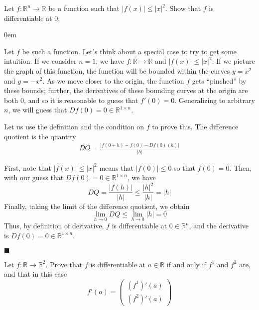 \documentclass[12pt]{article}
\renewcommand{\qed}{\hfill$\blacksquare$}
\renewenvironment{proof}{\begin{addmargin}[1em]{0em}\begin{newproof}}{\end{newproof}\end{addmargin}\qed}
\newenvironment{problem}[2][Problem]{\begin{trivlist}
\item[\hskip \labelsep {\bfseries #1}\hskip \labelsep {\bfseries #2.}]}{\end{trivlist}}
\begin{document}
\begin{problem}{2.7}
Let $f:\mathbb{R}^n\rightarrow \mathbb{R}$ be a function such that $\left|f\left(x\right)\right| \leq \left|x\right|^2$. Show that $f$ is differentiable at $0$.
\end{problem}

\begin{proof}
Let $f$ be such a function. Let's think about a special case to try to get some intuition. If we consider $n=1$, we have $f:\mathbb{R}\rightarrow \mathbb{R}$ and $\left|f\left(x\right)\right| \leq \left|x\right|^2$. If we picture the graph of this function, the function will be bounded within the curves $y=x^2$ and $y=-x^2$. As we move closer to the origin, the function $f$ gets ``pinched'' by these bounds; further, the derivatives of these bounding curves at the origin are both $0$, and so it is reasonable to guess that $f'\left(0\right)=0$. Generalizing to arbitrary $n$, we will guess that $Df\left(0\right) = 0 \in \mathbb{R}^{1 \times n}$.

Let us use the definition and the condition on $f$ to prove this. The difference quotient is the quantity
\begin{equation*}\begin{split}
DQ = \frac{\left|f\left(0+h\right) - f\left(0\right) - Df\left(0\right) \left(h\right)  \right|}{\left| h\right|}
\end{split}\end{equation*}

First, note that $\left|f\left(x\right)\right| \leq \left| x\right|^2$ means that $ \left|f\left(0\right)\right| \leq 0$ so that $f\left(0\right)=0$. Then, with our guess that $Df\left(0\right) = 0\in \mathbb{R}^{1\times n}$, we have
\begin{equation*}
DQ = \frac{\left| f\left(h\right) \right|}{\left| h\right|} \leq \frac{\left|h\right|^2}{\left|h\right|} = \left|h\right|
\end{equation*}
Finally, taking the limit of the difference quotient, we obtain
\begin{equation*}
\lim_{h\rightarrow 0} DQ \leq \lim_{h\rightarrow 0} \left|h\right| = 0
\end{equation*}
Thus, by definition of derivative, $f$ is differentiable at $0\in \mathbb{R}^n$, and the derivative is $Df\left(0\right) = 0 \in \mathbb{R}^{1\times n}$.
\end{proof}




\begin{problem}{2.8}
Let $f:\mathbb{R}\rightarrow\mathbb{R}^2$. Prove that $f$ is differentiable at $a \in \mathbb{R}$ if and only if $f^1$ and $f^2$ are, and that in this case
$$ f'\left(a\right) = \left( \begin{array}{c} \left(f^1\right)'\left(a\right) \\ \left(f^2 \right)'\left(a\right) \end{array} \right)$$
\end{problem}
\end{document}
